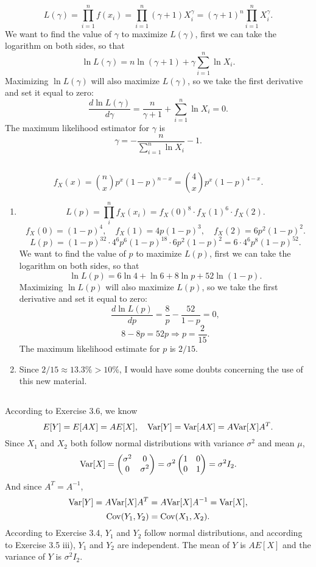 \documentclass[11pt,a4paper]{article}
\begin{document}
\subsection{}
$$L(\gamma)=\prod_{i=1}^nf(x_i)=\prod_{i=1}^n(\gamma+1)X_i^\gamma=(\gamma+1)^n\prod_{i=1}^nX_i^\gamma.$$
We want to find the value of $\gamma$ to maximize $L(\gamma)$, first we can take the logarithm on both sides, so that
$$\ln L(\gamma)=n\ln(\gamma+1)+\gamma\sum_{i=1}^n\ln X_i.$$
Maximizing $\ln L(\gamma)$ will also maximize $L(\gamma)$, so we take the first derivative and set it equal to zero:
$$\frac{d\ln L(\gamma)}{d\gamma}=\frac{n}{\gamma+1}+\sum_{i=1}^n\ln X_i=0.$$
The maximum likelihood estimator for $\gamma$ is
$$\gamma=-\frac{n}{\sum_{i=1}^n\ln X_i}-1.$$

\subsection{}

$$f_X(x)=\binom{n}{x}p^x(1-p)^{n-x}=\binom{4}{x}p^x(1-p)^{4-x}.$$
\begin{enumerate}[label=\roman*)]
\item
$$L(p)=\prod_i^nf_X(x_i)=f_X(0)^8\cdot f_X(1)^6\cdot f_X(2).$$
$$f_X(0)=(1-p)^4,\quad f_X(1)=4p(1-p)^3,\quad f_X(2)=6p^2(1-p)^2.$$
$$L(p)=(1-p)^{32}\cdot4^6p^6(1-p)^{18}\cdot6p^2(1-p)^2=6\cdot4^6p^8(1-p)^{52}.$$
We want to find the value of $p$ to maximize $L(p)$, first we can take the logarithm on both sides, so that
$$\ln L(p)=6\ln4+\ln6+8\ln p+52\ln (1-p).$$
Maximizing $\ln L(p)$ will also maximize $L(p)$, so we take the first derivative and set it equal to zero:
$$\frac{d\ln L(p)}{dp}=\frac{8}{p}-\frac{52}{1-p}=0,$$
$$8-8p=52p\Longrightarrow p=\frac{2}{15}.$$
The maximum likelihood estimate for $p$ is $2/15$.
\item
Since $2/15\approx13.3\%>10\%$, I would have some doubts concerning the use of this new material.
\end{enumerate}

\subsection{}
According to Exercise 3.6, we know
$$E[Y]=E[AX]=AE[X],\quad {\rm Var}[Y]={\rm Var}[AX]=A{\rm Var}[X]A^T.$$
Since $X_1$ and $X_2$ both follow normal distributions with variance $\sigma^2$ and mean $\mu$,
$${\rm Var}[X]=\begin{pmatrix}\sigma^2&0\\0&\sigma^2\end{pmatrix}=\sigma^2\begin{pmatrix}1&0\\0&1\end{pmatrix}=\sigma^2I_2.$$
And since $A^T=A^{-1}$,
$${\rm Var}[Y]=A{\rm Var}[X]A^T=A{\rm Var}[X]A^{-1}={\rm Var}[X],$$
$${\rm Cov}(Y_1,Y_2)={\rm Cov}(X_1,X_2).$$
According to Exercise 3.4, $Y_1$ and $Y_2$ follow normal distributions, and according to Exercise 3.5 iii), $Y_1$ and $Y_2$ are independent. The mean of $Y$ is $AE[X]$ and the variance of $Y$ is $\sigma^2 I_2$. 
\end{document}
